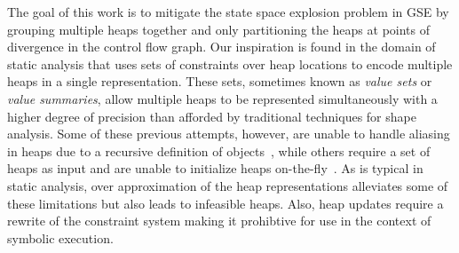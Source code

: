 
The goal of this work is to mitigate the state space explosion problem
in GSE by grouping multiple heaps together and only partitioning the
heaps at points of divergence in the control flow graph. Our
inspiration is found in the domain of static analysis that uses sets
of constraints over heap locations to encode multiple heaps in a
single representation. These sets, sometimes known as \emph{value
  sets} or \emph{value summaries}, allow multiple heaps to be
represented simultaneously with a higher degree of precision than
afforded by traditional techniques for shape analysis. Some of these
previous attempts, however, are unable to handle aliasing in heaps due
to a recursive definition of objects~\cite{Xie:2005}, while others require a
set of heaps as input and are unable to initialize heaps
on-the-fly~\cite{Dillig:2011,Tillmann:2008}.  As is typical in static analysis, over
approximation of the heap representations alleviates some of these
limitations but also leads to infeasible heaps. Also, heap updates
require a rewrite of the constraint system making it prohibtive for use
in the context of symbolic execution.

\begin{comment}
Unfortunately, value sets often do not support aliasing and require a
recursive definition of objects~\cite{..}. Also, heap updates often
require that the path constraint be rewritten to reflect the update,
and the constraints in the value set may also need to be rewritten with the
addition of auxiliary variables. These non-local operations make it
difficult to use value sets in symbolic execution. As is
typical in static analysis, over approximation of the value sets
alleviates some of the limitations but also leads to false positives.
\end{comment}




